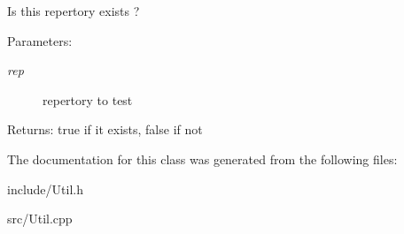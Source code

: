 Is this repertory exists ? \begin{Desc}
\item[Parameters:]
\begin{description}
\item[{\em rep}]repertory to test \end{description}
\end{Desc}
\begin{Desc}
\item[Returns:]true if it exists, false if not \end{Desc}


The documentation for this class was generated from the following files:\begin{CompactItemize}
\item 
include/Util.h\item 
src/Util.cpp\end{CompactItemize}
